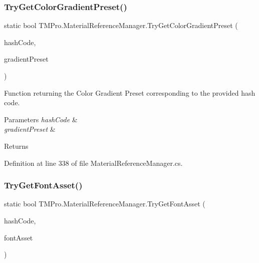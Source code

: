 \subsubsection{\texorpdfstring{TryGetColorGradientPreset()}{TryGetColorGradientPreset()}}
{\footnotesize\ttfamily static bool T\+M\+Pro.\+Material\+Reference\+Manager.\+Try\+Get\+Color\+Gradient\+Preset (\begin{DoxyParamCaption}\item[{int}]{hash\+Code,  }\item[{out \mbox{\hyperlink{class_t_m_pro_1_1_t_m_p___color_gradient}{T\+M\+P\+\_\+\+Color\+Gradient}}}]{gradient\+Preset }\end{DoxyParamCaption})\hspace{0.3cm}{\ttfamily [static]}}



Function returning the Color Gradient Preset corresponding to the provided hash code. 


\begin{DoxyParams}{Parameters}
{\em hash\+Code} & \\
\hline
{\em gradient\+Preset} & \\
\hline
\end{DoxyParams}
\begin{DoxyReturn}{Returns}

\end{DoxyReturn}


Definition at line 338 of file Material\+Reference\+Manager.\+cs.

\mbox{\label{class_t_m_pro_1_1_material_reference_manager_aea90526985cf5081a931bfbc4d36af81}} 
\subsubsection{\texorpdfstring{TryGetFontAsset()}{TryGetFontAsset()}}
{\footnotesize\ttfamily static bool T\+M\+Pro.\+Material\+Reference\+Manager.\+Try\+Get\+Font\+Asset (\begin{DoxyParamCaption}\item[{int}]{hash\+Code,  }\item[{out \mbox{\hyperlink{class_t_m_pro_1_1_t_m_p___font_asset}{T\+M\+P\+\_\+\+Font\+Asset}}}]{font\+Asset }\end{DoxyParamCaption})\hspace{0.3cm}{\ttfamily [static]}}



